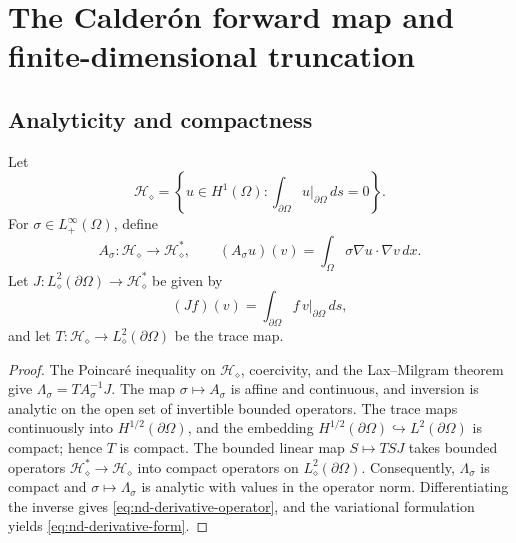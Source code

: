 \documentclass[11pt,oneside]{amsart}
\theoremstyle{plain}
\newtheorem{proposition}[theorem]{Proposition}
\theoremstyle{definition}
\theoremstyle{remark}
\newcommand{\calK}{\mathcal{K}}
\newcommand{\restr}[2]{\left.#1\right|_{#2}}
\begin{document}
\section{The Calder\'on forward map and finite-dimensional truncation}\label{sec:proof-calderon}

\subsection{Analyticity and compactness}
Let
\[
    \mathcal H_\diamond
    =\left\{u\in H^1(\Omega):\int_{\partial\Omega}\restr{u}{\partial\Omega}\,ds=0\right\}.
\]
For $\sigma\in L^\infty_+(\Omega)$, define
\[
    A_\sigma\colon\mathcal H_\diamond\to\mathcal H_\diamond^*,
    \qquad
    (A_\sigma u)(v)=\int_\Omega\sigma\nabla u\cdot\nabla v\,dx.
\]
Let $J\colon L^2_\diamond(\partial\Omega)\to\mathcal H_\diamond^*$ be given by
\[
    (Jf)(v)=\int_{\partial\Omega}f\,\restr{v}{\partial\Omega}\,ds,
\]
and let $T\colon\mathcal H_\diamond\to L^2_\diamond(\partial\Omega)$ be the trace map.


\begin{proof}
The Poincar{\'e} inequality on $\mathcal H_\diamond$, coercivity, and the Lax--Milgram theorem give $\Lambda_\sigma=TA_\sigma^{-1}J$. The map $\sigma\mapsto A_\sigma$ is affine and continuous, and inversion is analytic on the open set of invertible bounded operators. The trace maps continuously into $H^{1/2}(\partial\Omega)$, and the embedding $H^{1/2}(\partial\Omega)\hookrightarrow L^2(\partial\Omega)$ is compact; hence $T$ is compact. The bounded linear map $S\mapsto TSJ$ takes bounded operators $\mathcal H_\diamond^*\to\mathcal H_\diamond$ into compact operators on $L^2_\diamond(\partial\Omega)$. Consequently, $\Lambda_\sigma$ is compact and $\sigma\mapsto\Lambda_\sigma$ is analytic with values in the operator norm. Differentiating the inverse gives \eqref{eq:nd-derivative-operator}, and the variational formulation yields \eqref{eq:nd-derivative-form}.
\end{proof}
\end{document}
